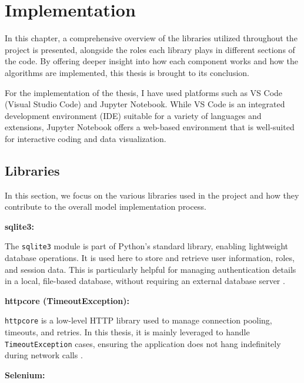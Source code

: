 \chapter{Implementation}

\label{Chapter4}
In this chapter, a comprehensive overview of the libraries utilized throughout the project is presented, 
alongside the roles each library plays in different sections of the code. By offering deeper insight 
into how each component works and how the algorithms are implemented, this thesis is brought to its conclusion.

For the implementation of the thesis, I have used platforms such as VS Code (Visual Studio Code) and Jupyter Notebook. 
While VS Code is an integrated development environment (IDE) suitable for a variety of languages and extensions, 
Jupyter Notebook offers a web-based environment that is well-suited for interactive coding and data visualization.


\vspace{1cm}
\section{Libraries}
In this section, we focus on the various libraries used in the project and how they contribute to the overall model implementation process.

\vspace{0.4cm}
\noindent\textbf{sqlite3:}

\noindent
The \texttt{sqlite3} module is part of Python’s standard library, enabling lightweight database operations. 
It is used here to store and retrieve user information, roles, and session data. This is particularly helpful 
for managing authentication details in a local, file-based database, without requiring an external database server \cite{sqlite3}.

\vspace{0.4cm}
\noindent\textbf{httpcore (TimeoutException):}

\noindent
\texttt{httpcore} is a low-level HTTP library used to manage connection pooling, timeouts, and retries. 
In this thesis, it is mainly leveraged to handle \texttt{TimeoutException} cases, ensuring the application 
does not hang indefinitely during network calls \cite{httpcore}.

\vspace{0.4cm}
\noindent\textbf{Selenium:}

